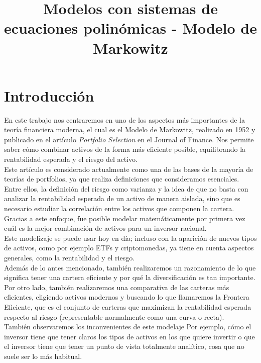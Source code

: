 \documentclass[12pt,a4paper]{report}
\title{Modelos con sistemas de ecuaciones polinómicas - Modelo de Markowitz}{
    \author{
        Yu Xiang Yang Xu \and
        Álvaro Vicente Bonilla
    }
    \date{\today}
    }
\begin{document}
    \maketitle
    \tableofcontents
    \newpage

    \chapter{Introducción}
    En este trabajo nos centraremos en uno de los aspectos más importantes de la teoría financiera moderna, el cual es el Modelo de Markowitz, realizado en 1952 y publicado en el artículo \textit{Portfolio Selection} en el Journal of Finance. Nos permite saber cómo combinar activos de la forma más eficiente posible, equilibrando la rentabilidad esperada y el riesgo del activo. \\

    Este artículo es considerado actualmente como una de las bases de la mayoría de teorías de portfolios, ya que realiza definiciones que consideramos esenciales. Entre ellos, la definición del riesgo como varianza y la idea de que no basta con analizar la rentabilidad esperada de un activo de manera aislada, sino que es necesario estudiar la correlación entre los activos que componen la cartera. Gracias a este enfoque, fue posible modelar matemáticamente por primera vez cuál es la mejor combinación de activos para un inversor racional.\\

    Este modelizaje se puede usar hoy en día; incluso con la aparición de nuevos tipos de activos, como por ejemplo ETFs y criptomonedas, ya tiene en cuenta aspectos generales, como la rentabilidad y el riesgo.\\ 

    Además de lo antes mencionado, también realizaremos un razonamiento de lo que significa tener una cartera eficiente y por qué la diversificación es tan importante.   \\

    Por otro lado, también realizaremos una comparativa de las carteras más eficientes, eligiendo activos modernos y buscando lo que llamaremos la Frontera Eficiente, que es el conjunto de carteras que maximizan la rentabilidad esperada respecto al riesgo (representable normalmente como una curva o recta).\\

    También observaremos los inconvenientes de este modelaje Por ejemplo, cómo el inversor tiene que tener claros los tipos de activos en los que quiere invertir o que el inversor tiene que tener un punto de vista totalmente analítico, cosa que no suele ser lo más habitual.
\end{document}
